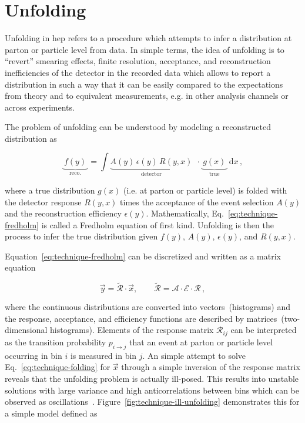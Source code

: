 \section{Unfolding}

Unfolding in \gls{hep} refers to a procedure which attempts to infer a distribution at parton or particle level from data. In simple terms, the idea of unfolding is to ``revert'' smearing effects, finite resolution, acceptance, and reconstruction inefficiencies of the detector in the recorded data which allows to report a distribution in such a way that it can be easily compared to the expectations from theory and to equivalent measurements, e.g. in other analysis channels or across experiments.

The problem of unfolding can be understood by modeling a reconstructed distribution as 

\begin{equation}
\underbrace{~f(y)~}_\mathrm{reco.}=\int \underbrace{A(y)\,\epsilon(y)\, R(y,x)}_\mathrm{detector}~~\cdot \underbrace{~g(x)~}_\mathrm{true}\, \mathrm{d}x\,, \label{eq:technique-fredholm}
\end{equation}

where a true distribution $g(x)$ (i.e. at parton or particle level) is folded with the detector response $R(y,x)$ times the acceptance of the event selection $A(y)$ and the reconstruction efficiency $\epsilon(y)$. Mathematically, Eq.~\ref{eq:technique-fredholm} is called a Fredholm equation of first kind. Unfolding is then the process to infer the true distribution given $f(y)$, $A(y)$, $\epsilon(y)$, and $R(y,x)$. 

Equation~\ref{eq:technique-fredholm} can be discretized and written as a matrix equation

\begin{equation}
\vec{y} = \widetilde{\mathcal{R}}\cdot\vec{x},\qquad \widetilde{\mathcal{R}}=\mathcal{A}\cdot\mathcal{E}\cdot\mathcal{R}\,, \label{eq:technique-folding}
\end{equation}

where the continuous distributions are converted into vectors~(histograms) and the response, acceptance, and efficiency functions are described by matrices~(two-dimensional histograms). Elements of the response matrix $\mathcal{R}_{ij}$ can be interpreted as the transition probability $p_{i\to j}$ that an event at parton or particle level occurring in bin $i$ is measured in bin $j$. An simple attempt to solve Eq.~\ref{eq:technique-folding} for $\vec{x}$ through a simple inversion of the response matrix reveals that the unfolding problem is actually ill-posed. This results into unstable solutions with large variance and high anticorrelations between bins which can be observed as oscillations~\cite{Cowan:2002in}. Figure~\ref{fig:technique-ill-unfolding} demonstrates this for a simple model defined as

